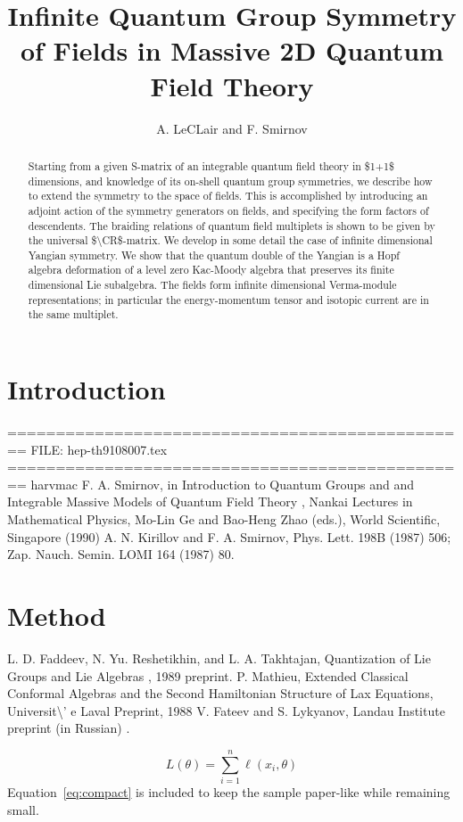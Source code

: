 \documentclass[11pt]{article}
\title{Infinite Quantum Group Symmetry of Fields in Massive 2D Quantum Field
  Theory}
\author{A. LeCLair and F. Smirnov}
\date{}
\begin{document}
\maketitle
\begin{abstract}

Starting from a given S-matrix of an integrable quantum field theory in \$1+1\$ dimensions, and knowledge of its on-shell quantum group symmetries, we describe how to extend the symmetry to the space of fields. This is accomplished by introducing an adjoint action of the symmetry generators on fields, and specifying the form factors of descendents. The braiding relations of quantum field multiplets is shown to be given by the universal \$\textbackslash{}CR\$-matrix. We develop in some detail the case of infinite dimensional Yangian symmetry. We show that the quantum double of the Yangian is a Hopf algebra deformation of a level zero Kac-Moody algebra that preserves its finite dimensional Lie subalgebra. The fields form infinite dimensional Verma-module representations; in particular the energy-momentum tensor and isotopic current are in the same multiplet.

\end{abstract}

\section{Introduction}

================================================ FILE: hep-th9108007.tex ================================================ harvmac F. A. Smirnov, in Introduction to Quantum Groups and and Integrable Massive Models of Quantum Field Theory , Nankai Lectures in Mathematical Physics, Mo-Lin Ge and Bao-Heng Zhao (eds.), World Scientific, Singapore (1990) A. N. Kirillov and F. A. Smirnov, Phys. Lett. 198B (1987) 506; Zap. Nauch. Semin. LOMI 164 (1987) 80.

\section{Method}

L. D. Faddeev, N. Yu. Reshetikhin, and L. A. Takhtajan, Quantization of Lie Groups and Lie Algebras , 1989 preprint. P. Mathieu, Extended Classical Conformal Algebras and the Second Hamiltonian Structure of Lax Equations, Universit\textbackslash{}' e Laval Preprint, 1988 V. Fateev and S. Lykyanov, Landau Institute preprint (in Russian) .

\begin{equation}
\label{eq:compact}
L(\theta) = \sum_{i=1}^{n} \ell(x_i, \theta)
\end{equation}
Equation~\ref{eq:compact} is included to keep the sample paper-like while remaining small.
\end{document}
